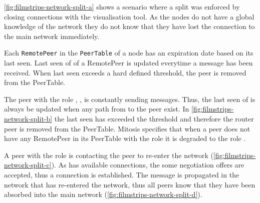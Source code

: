 \vref{fig:filmstrips-network-split-a} shows a scenario where a split was enforced by closing connections with the visualisation tool. As the nodes do not have a global knowledge of the network they do not know that they have lost the connection to the main network immediately.

Each \lstinline|RemotePeer| in the \lstinline|PeerTable| of a node has an expiration date based on its last seen. Last seen of of a RemotePeer is updated everytime a message has been received. When last seen exceeds a hard defined threshold, the peer is removed from the PeerTable.

The peer with the role \router, \alice, is constantly sending \routerAlive messages. Thus, the last seen of \alice is always be updated when any path from \alice to the peer exist. 
In \vref{fig:filmstrips-network-split-b} the last seen has exceeded the threshold and therefore the router peer \alice is removed from the PeerTable. Mitosis specifies that when a peer does not have any RemotePeer in its PeerTable with the role \router it is degraded to the role \newbie.

A peer with the role \peer is contacting the \signal peer to re-enter the network (\vref{fig:filmstrips-network-split-c}). As \alice has available connections, the some negotiation offers are accepted, thus a connection is established. The \routerAlive message is propagated in the network that has re-entered the network, thus all peers know that they have been absorbed into the main network (\vref{fig:filmstrips-network-split-d}).